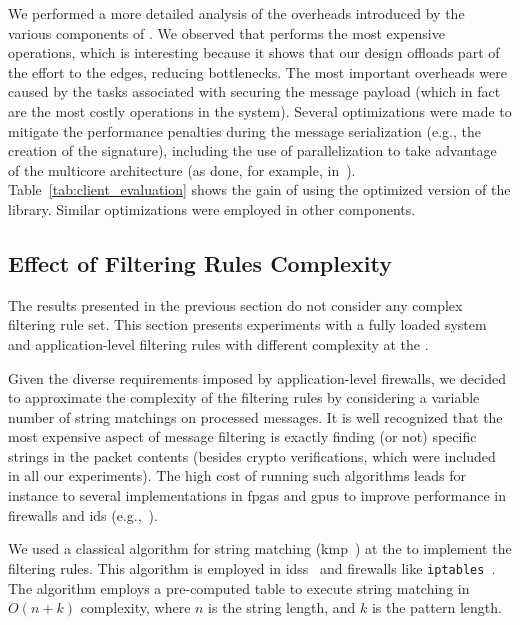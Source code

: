 We performed a more detailed analysis of the overheads introduced by the various components of \sieveq.
We observed that \sender performs the most expensive operations, which is interesting because it shows that our design offloads part of the effort to the edges, reducing bottlenecks.
The most important overheads were caused by the tasks associated with securing the message payload (which in fact are the most costly operations in the system). Several optimizations were made to mitigate the performance penalties during the message serialization (e.g., the creation of the signature), including the use of parallelization to take advantage of the multicore architecture (as done, for example, in~\cite{Kirsch:2014}).
Table~\ref{tab:client_evaluation} shows the gain of using the optimized version of the \sender library. Similar optimizations were employed in other components.



\subsection{Effect of Filtering Rules Complexity}


The results presented in the previous section do not consider any complex filtering rule set.
This section presents experiments with a fully loaded system and application-level filtering rules with different complexity at the \repsieves.

Given the diverse requirements imposed by application-level firewalls, we decided to approximate the complexity of the filtering rules by considering a variable number of string matchings on processed messages.  It is well recognized that the most expensive aspect of message filtering is exactly finding (or not) specific strings in the packet contents (besides crypto verifications, which were included in all our experiments). 
The high cost of running such algorithms leads for instance to several implementations in \glspl{fpga} and \glspl{gpu} to improve performance in firewalls and \gls{ids} (e.g.,~\cite{Moscola:2003,Lee:2015}).

We used a classical algorithm for string matching (\gls{kmp}~\cite{Knuth:1977}) at the \repsieves to implement the filtering rules.
This algorithm is employed in \glspl{ids}~\cite{Prabha:2014} and firewalls like \texttt{iptables}~\cite{iptables}.
The algorithm employs a pre-computed table to execute string matching in $O(n + k)$ complexity, where $n$ is the string length, and $k$ is the pattern length.


